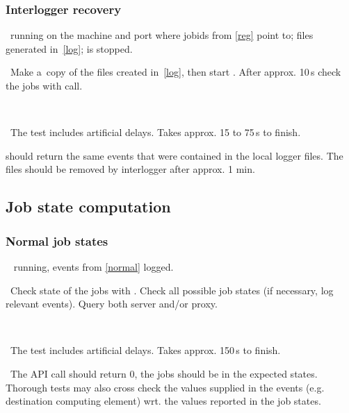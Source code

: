 \subsubsection{Interlogger recovery}
\label{recover}

\req\ running  on the machine and port where
jobids from \ref{reg} point to; files generated in~\ref{log};
 is stopped.

\what\ Make a~copy of the files created in~\ref{log}, then start
. After approx. 10\,s check the jobs
with  call.

\how\ 

\note\ The test includes artificial delays. Takes approx. 15 to 75\,s to finish.

\result {} should return the same events that were
contained in the local logger files. The files should be removed by
interlogger after approx. 1 min.





\subsection{Job state computation}

\subsubsection{Normal job states}
\label{state}

\req\  running, events from \ref{normal} logged.

\what\ Check state of the jobs with . Check all possible job states 
(if necessary, log relevant events). Query both server and/or proxy.

\how\ 

\note\ The test includes artificial delays. Takes approx. 150\,s to finish.

\result\ The API call should return 0, the jobs should be in the expected
states. Thorough tests may also cross check the values supplied in the
events (e.g. destination computing element) wrt. the values reported in the job states.



